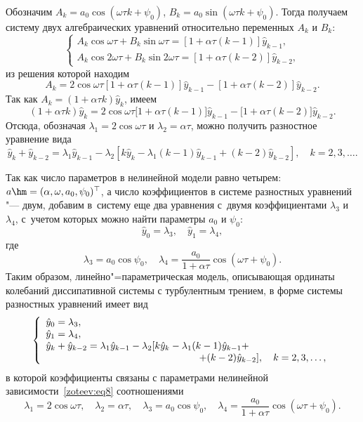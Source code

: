Обозначим $A_k=a_0\cos(\omega\tau k+\psi_0)$,	$B_k=a_0\sin(\omega\tau k+\psi_0)$. Тогда получаем систему двух алгебраических уравнений относительно переменных $A_k$ и $B_k$:
\begin{equation*}
\left\{
\begin{array}{l}
{A_k\cos\omega\tau+B_k\sin\omega\tau=[1+\alpha\tau(k-1)]\hat{y}_{k-1},} \\
{A_k\cos2\omega\tau+B_k\sin2\omega\tau=[1+\alpha\tau(k-2)]\hat{y}_{k-2},} 
\end{array}
\right.
\end{equation*}
из решения которой находим
$$
A_k=2\cos\omega\tau[1+\alpha\tau(k-1)]\hat{y}_{k-1}-[1+\alpha\tau(k-2)]\hat{y}_{k-2}.
$$
Так как $A_k=(1+\alpha\tau k)\hat{y}_k$, имеем
$$
(1+\alpha\tau k)\hat{y}_k=2\cos\omega\tau\big[1+\alpha\tau (k-1)\big]\hat{y}_{k-1}-\big[1+\alpha\tau (k-2)\big]\hat{y}_{k-2}.
$$
Отсюда, обозначая $\lambda_1=2\cos\omega\tau$ и $\lambda_2=\alpha\tau$, можно получить разностное уравнение вида 
$$\hat{y}_k+\hat{y}_{k-2}=\lambda_1\hat{y}_{k-1}-\lambda_2[k\hat{y}_k-\lambda_1(k-1)\hat{y}_{k-1}+(k-2)\hat{y}_{k-2}], \quad k=2,3,\dots.$$

Так как число параметров в нелинейной модели равно четырем: $a\hm =(\alpha, \omega, a_0, \psi_0)^{\top}$, а число коэффициентов в системе разностных уравнений "--- двум, добавим в~систему еще два уравнения с~двумя коэффициентами  $\lambda_3$ и~$\lambda_4$, с~учетом которых можно найти параметры $a_0$ и $\psi_0$: 
$$\hat{y}_0=\lambda_3,\quad \hat{y}_1=\lambda_4,$$ 
где $$\lambda_3=a_0\cos\psi_0,\quad  \lambda_4=\frac{a_0}{1+\alpha\tau}\cos(\omega\tau+\psi_0).$$ 
Таким образом, линейно"=параметрическая модель, описывающая ординаты колебаний диссипативной системы с турбулентным трением, в форме системы разностных уравнений имеет вид
\begin{equation}
\left\{
\begin{array}{l}
{\hat{y}_0=\lambda_3,} \\
{\hat{y}_1=\lambda_4,} \\
\hat{y}_k+\hat{y}_{k-2}=\lambda_1\hat{y}_{k-1}- \lambda_2[k\hat{y}_k-\lambda_1(k-1)\hat{y}_{k-1} + \\
\hspace{5.5cm} +(k-2)\hat{y}_{k-2}],\quad k=2,3,\dots,
\label{zoteev:eq9}
\end{array}
\right.
\end{equation}
в которой коэффициенты связаны с параметрами нелинейной зависимости~\eqref{zoteev:eq8} соотношениями
\begin{equation}
\lambda_1=2\cos\omega\tau, \quad \lambda_2=\alpha\tau, \quad \lambda_3=a_0\cos\psi_0, \quad \lambda_4=\dfrac{a_0}{1+\alpha\tau}\cos(\omega\tau+\psi_0).
\label{zoteev:eq10}
\end{equation}

